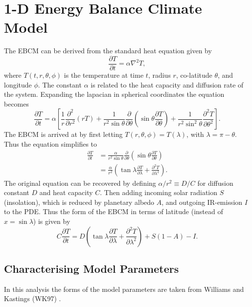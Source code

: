 \documentclass[12pt, onecolumn]{revtex4-2}    %
\newcommand{\partialderiv}[2]{\frac{\partial {#1}}{\partial {#2}}}
\newcommand{\partialderivsecnd}[2]{\frac{\partial^2 {#1}}{\partial {#2}^2}}
\begin{document}
\section{1-D Energy Balance Climate Model}\label{sec:1DEBCM}
The EBCM can be derived from the standard heat equation given by
\begin{equation}
    \partialderiv{T}{t} = \alpha \nabla^2 T,
\end{equation}
where $T(t, r, \theta, \phi)$ is the temperature at time $t$, radius $r$, co-latitude $\theta$, and longitude $\phi$.
The constant $\alpha$ is related to the heat capacity and diffusion rate of the system.
Expanding the lapacian in spherical coordinates the equation becomes
\begin{equation}
    \partialderiv{T}{t} = \alpha \left[\frac{1}{r} \partialderivsecnd{}{r} (r T)
        + \frac{1}{r^2 \sin\theta} \partialderiv{}{\theta}\left(\sin\theta \partialderiv{T}{\theta}\right)
        + \frac{1}{r^2 \sin^2\theta} \partialderivsecnd{T}{\theta} \right]. \label{eq:FullyExpandedHeatEqn}
\end{equation}
The EBCM is arrived at by first letting $T(r, \theta, \phi) = T(\lambda)$, with $\lambda = \pi - \theta$. Thus the equation simplifies to
\begin{align}
    \partialderiv{T}{t} & = \frac{\alpha}{r^2 \sin\theta} \partialderiv{}{\theta}\left(\sin\theta \partialderiv{T}{\theta}\right)   \\
                        & = \frac{\alpha}{r^2} \left(\tan\lambda \partialderiv{T}{\lambda} + \partialderivsecnd{T}{\lambda}\right).
\end{align}
The original equation can be recovered by defining $\alpha / r^2 \equiv D / C$ for diffusion constant $D$ and heat capacity $C$.
Then adding incoming solar radiation $S$ (insolation), which is reduced by planetary albedo $A$, and outgoing IR-emission $I$ to the PDE.
Thus the form of the EBCM in terms of latitude (instead of $x = \sin\lambda$) is given by
\begin{equation}
    C\partialderiv{T}{t} = D \left(\tan\lambda \partialderiv{T}{\lambda} + \partialderivsecnd{T}{\lambda}\right) + S(1-A) - I.
\end{equation}
\subsection{Characterising Model Parameters} \label{ssec:CharacterisingModelParameters} %
In this analysis the forms of the model parameters are taken from Williams and Kastings (WK97) \cite{WK97}.
\end{document}
